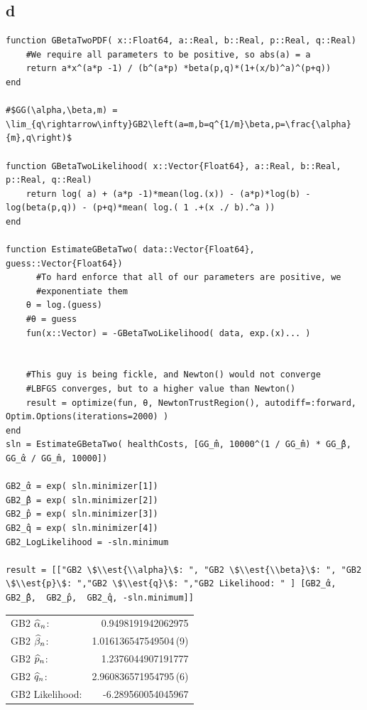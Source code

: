 \documentclass[12pt, letterpaper]{paper}
\begin{document}
\subsection{d}
\label{sec:org1d93659}
\begin{verbatim}
function GBetaTwoPDF( x::Float64, a::Real, b::Real, p::Real, q::Real)
    #We require all parameters to be positive, so abs(a) = a
    return a*x^(a*p -1) / (b^(a*p) *beta(p,q)*(1+(x/b)^a)^(p+q))
end

#$GG(\alpha,\beta,m) = \lim_{q\rightarrow\infty}GB2\left(a=m,b=q^{1/m}\beta,p=\frac{\alpha}{m},q\right)$

function GBetaTwoLikelihood( x::Vector{Float64}, a::Real, b::Real, p::Real, q::Real)
    return log( a) + (a*p -1)*mean(log.(x)) - (a*p)*log(b) - log(beta(p,q)) - (p+q)*mean( log.( 1 .+(x ./ b).^a ))
end

function EstimateGBetaTwo( data::Vector{Float64}, guess::Vector{Float64})
      #To hard enforce that all of our parameters are positive, we
      #exponentiate them
    θ = log.(guess)
    #θ = guess
    fun(x::Vector) = -GBetaTwoLikelihood( data, exp.(x)... )


    #This guy is being fickle, and Newton() would not converge
    #LBFGS converges, but to a higher value than Newton()
    result = optimize(fun, θ, NewtonTrustRegion(), autodiff=:forward, Optim.Options(iterations=2000) )
end
sln = EstimateGBetaTwo( healthCosts, [GG_̂m, 10000^(1 / GG_̂m) * GG_̂β, GG_̂α / GG_̂m, 10000])

GB2_̂α = exp( sln.minimizer[1])
GB2_̂β = exp( sln.minimizer[2])
GB2_̂p = exp( sln.minimizer[3])
GB2_̂q = exp( sln.minimizer[4])
GB2_LogLikelihood = -sln.minimum

result = [["GB2 \$\\est{\\alpha}\$: ", "GB2 \$\\est{\\beta}\$: ", "GB2 \$\\est{p}\$: ","GB2 \$\\est{q}\$: ","GB2 Likelihood: " ] [GB2_̂α, GB2_̂β,  GB2_̂p,  GB2_̂q, -sln.minimum]]
\end{verbatim}

\begin{center}
\begin{tabular}{lr}
GB2 \(\widehat{ \alpha }_{n}\): & 0.9498191942062975\\
GB2 \(\widehat{ \beta }_{n}\): & 1.016136547549504\,(9)\\
GB2 \(\widehat{ p }_{n}\): & 1.2376044907191777\\
GB2 \(\widehat{ q }_{n}\): & 2.960836571954795\,(6)\\
GB2 Likelihood: & -6.289560054045967\\
\end{tabular}
\end{center}
\end{document}
